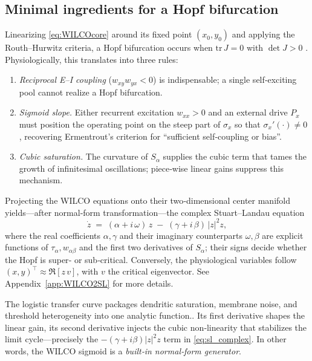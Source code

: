 \documentclass[12pt]{article}
\numberwithin{equation}{section}
\newcommand{\rev}[1]{\begingroup\color{navyblue}#1\endgroup}
\begin{document}
\subsection{Minimal ingredients for a Hopf bifurcation}

Linearizing \eqref{eq:WILCOcore} around its fixed point \((x_0,y_0)\) and applying the Routh–Hurwitz criteria, a Hopf bifurcation occurs when \(\text{tr}\,J=0\) with \(\det J>0\) \cite{guckenheimerNonlinearOscillationsDynamical2002}.
Physiologically, this translates into three rules:

\begin{enumerate}
  \item \emph{Reciprocal E–I coupling} (\(w_{xy}w_{yx}<0\)) is indispensable; a single self‑exciting pool cannot realize a  Hopf bifurcation.
  \item \emph{Sigmoid slope.} Either recurrent excitation \(w_{xx}>0\) \rev{and} an external drive \(P_x\) must position the operating point on the steep part of \(\sigma_x\) so that \(\sigma_x'(\cdot)\neq0\), recovering Ermentrout’s criterion for “sufficient self‑coupling or bias”.\cite{Ermentrout:2010aa}
  \item \emph{Cubic saturation.} The curvature of \(S_{\alpha}\) supplies the cubic term that tames the growth of infinitesimal oscillations; piece‑wise linear gains suppress this mechanism.
\end{enumerate}


Projecting the WILCO equations onto their two‑dimensional center manifold yields—after normal‑form transformation—the complex Stuart–Landau equation
\cite{pietras2019network}
\begin{equation}
\dot{z} \;=\; (\alpha + i\,\omega)\,z \;-\; (\gamma + i\,\beta)\,\lvert z\rvert^{2}z,
\label{eq:sl_complex}
\end{equation}
where the real coefficients \(\alpha,\gamma\) and their imaginary counterparts \(\omega,\beta\) are explicit functions of \(\tau_{\alpha},w_{\alpha\beta}\) and the first two derivatives of \(S_{\alpha}\); their signs decide whether the Hopf is super‑ or sub‑critical.
Conversely, the physiological variables follow $(x,y)^\top \approx \Re[z\,v]$, with $v$ the critical eigenvector. See Appendix~\ref{app:WILCO2SL} for more details.

The logistic transfer curve packages dendritic saturation, membrane noise, and threshold heterogeneity into one analytic function.\cite{deco_dynamic_2008}. 
Its first derivative shapes the linear gain, its second derivative injects the cubic non‑linearity that stabilizes the limit cycle—precisely the \(-(\gamma+i\beta)|z|^{2}z\) term in \eqref{eq:sl_complex}.  In other words, the WILCO sigmoid is a \emph{built‑in normal‑form generator}.
\end{document}
